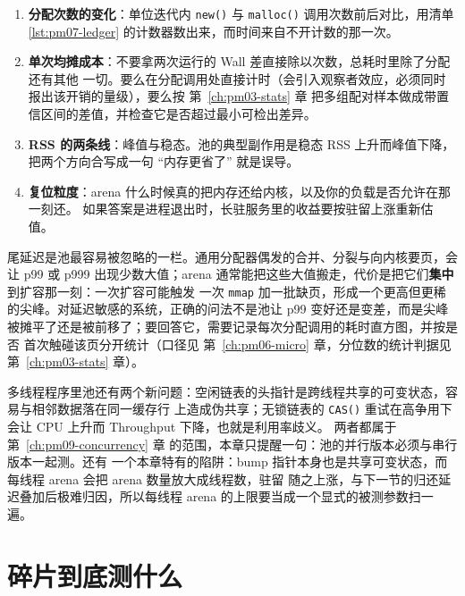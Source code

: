 \documentclass[12pt,a4paper,fontset=fandol]{ctexbook}
\newcommand{\Fn}[1]{\texttt{#1()}}
\newcommand{\Tp}[1]{\texttt{#1}}
\newcommand{\Lang}[1]{\textsf{#1}}
\newcommand{\MWall}{\Lang{Wall}}
\newcommand{\MCpu}{\Lang{CPU}}
\newcommand{\MThr}{\Lang{Throughput}}
\newcommand{\Mx}[1]{\textsf{#1}}
\begin{document}
\begin{guideline}[title={报告 arena 收益时必须同时贴出的四个数}]
  \begin{enumerate}
    \item \textbf{分配次数的变化}：单位迭代内 \Fn{new} 与 \Fn{malloc} 调用次数前后对比，用清单
          \ref{lst:pm07-ledger} 的计数器数出来，而时间来自不开计数的那一次。
    \item \textbf{单次均摊成本}：不要拿两次运行的 \MWall{} 差直接除以次数，总耗时里除了分配还有其他
          一切。要么在分配调用处直接计时（会引入观察者效应，必须同时报出该开销的量级），要么按
          第~\ref{ch:pm03-stats} 章 把多组配对样本做成带置信区间的差值，并检查它是否超过最小可检出差异。
    \item \textbf{\Mx{RSS} 的两条线}：峰值与稳态。池的典型副作用是稳态 \Mx{RSS} 上升而峰值下降，
          把两个方向合写成一句 ``内存更省了'' 就是误导。
    \item \textbf{复位粒度}：arena 什么时候真的把内存还给内核，以及你的负载是否允许在那一刻还。
          如果答案是进程退出时，长驻服务里的收益要按驻留上涨重新估值。
  \end{enumerate}
\end{guideline}

尾延迟是池最容易被忽略的一栏。通用分配器偶发的合并、分裂与向内核要页，会让 \Mx{p99} 或 \Mx{p999}
出现少数大值；arena 通常能把这些大值搬走，代价是把它们\textbf{集中}到扩容那一刻：一次扩容可能触发
一次 \Tp{mmap} 加一批缺页，形成一个更高但更稀的尖峰。对延迟敏感的系统，正确的问法不是池让 \Mx{p99}
变好还是变差，而是尖峰被摊平了还是被前移了；要回答它，需要记录每次分配调用的耗时直方图，并按是否
首次触碰该页分开统计（口径见 第~\ref{ch:pm06-micro} 章，分位数的统计判据见 第~\ref{ch:pm03-stats} 章）。

多线程程序里池还有两个新问题：空闲链表的头指针是跨线程共享的可变状态，容易与相邻数据落在同一缓存行
上造成伪共享；无锁链表的 \Fn{CAS} 重试在高争用下会让 \MCpu{} 上升而 \MThr{} 下降，也就是利用率歧义。
两者都属于 第~\ref{ch:pm09-concurrency} 章 的范围，本章只提醒一句：池的并行版本必须与串行版本一起测。还有
一个本章特有的陷阱：bump 指针本身也是共享可变状态，而每线程 arena 会把 arena 数量放大成线程数，驻留
随之上涨，与下一节的归还延迟叠加后极难归因，所以每线程 arena 的上限要当成一个显式的被测参数扫一遍。

\section{碎片到底测什么}
\label{sec:pm07-frag}
\end{document}
